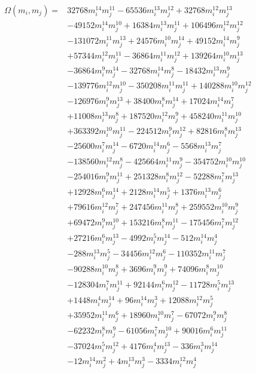 {\small
\begin{align*}
\Omega(m_i,m_j)={}&32768m_i^{14}m_j^{11}-65536m_i^{13}m_j^{12}+32768m_i^{12}m_j^{13}\\
&-49152m_i^{14}m_j^{10}+16384m_i^{13}m_j^{11}+106496m_i^{12}m_j^{12}\\
&-131072m_i^{11}m_j^{13}+24576m_i^{10}m_j^{14}+49152m_i^{14}m_j^{9}\\
&+57344m_i^{12}m_j^{11}-36864m_i^{11}m_j^{12}+139264m_i^{10}m_j^{13}\\
&-36864m_i^{9}m_j^{14}-32768m_i^{14}m_j^{8}-18432m_i^{13}m_j^{9}\\
&-139776m_i^{12}m_j^{10}-350208m_i^{11}m_j^{11}+140288m_i^{10}m_j^{12}\\
&-126976m_i^{9}m_j^{13}+38400m_i^{8}m_j^{14}+17024m_i^{14}m_j^{7}\\
&+11008m_i^{13}m_j^{8}+187520m_i^{12}m_j^{9}+458240m_i^{11}m_j^{10}\\
&+363392m_i^{10}m_j^{11}-224512m_i^{9}m_j^{12}+82816m_i^{8}m_j^{13}\\
&-25600m_i^{7}m_j^{14}-6720m_i^{14}m_j^{6}-5568m_i^{13}m_j^{7}\\
&-138560m_i^{12}m_j^{8}-425664m_i^{11}m_j^{9}-354752m_i^{10}m_j^{10}\\
&-254016m_i^{9}m_j^{11}+251328m_i^{8}m_j^{12}-52288m_i^{7}m_j^{13}\\
&+12928m_i^{6}m_j^{14}+2128m_i^{14}m_j^{5}+1376m_i^{13}m_j^{6}\\
&+79616m_i^{12}m_j^{7}+247456m_i^{11}m_j^{8}+259552m_i^{10}m_j^{9}\\
&+69472m_i^{9}m_j^{10}+153216m_i^{8}m_j^{11}-175456m_i^{7}m_j^{12}\\
&+27216m_i^{6}m_j^{13}-4992m_i^{5}m_j^{14}-512m_i^{14}m_j^{4}\\
&-288m_i^{13}m_j^{5}-34456m_i^{12}m_j^{6}-110352m_i^{11}m_j^{7}\\
&-90288m_i^{10}m_j^{8}+3696m_i^{9}m_j^{9}+74096m_i^{8}m_j^{10}\\
&-128304m_i^{7}m_j^{11}+92144m_i^{6}m_j^{12}-11728m_i^{5}m_j^{13}\\
&+1448m_i^{4}m_j^{14}+96m_i^{14}m_j^{3}+12088m_i^{12}m_j^{5}\\
&+35952m_i^{11}m_j^{6}+18960m_i^{10}m_j^{7}-67072m_i^{9}m_j^{8}\\
&-62232m_i^{8}m_j^{9}-61056m_i^{7}m_j^{10}+90016m_i^{6}m_j^{11}\\
&-37024m_i^{5}m_j^{12}+4176m_i^{4}m_j^{13}-336m_i^{3}m_j^{14}\\
&-12m_i^{14}m_j^{2}+4m_i^{13}m_j^{3}-3334m_i^{12}m_j^{4}\\

\end{align*}}

